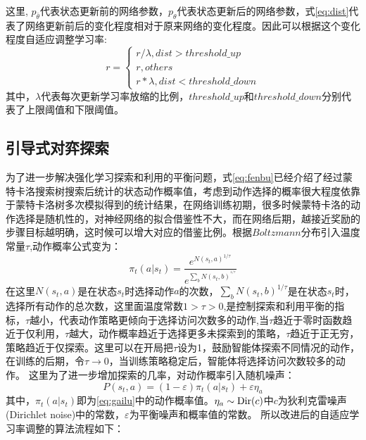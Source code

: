 这里, $p_{\bar \theta}$代表状态更新前的网络参数，$p_\theta $代表状态更新后的网络参数，式\ref{eq:dist}代表了网络更新前后的变化程度相对于原来网络的变化程度。因此可以根据这个变化程度自适应调整学习率:
\begin{equation}
\label{eq:r}
r = \left\{ {\begin{array}{*{20}{c}}
	{r/\lambda ,dist > threshold\_up}\\
	{r,others}\\
	{r*\lambda ,dist < threshold\_down}
	\end{array}} \right.
\end{equation}
其中，$\lambda$代表每次更新学习率放缩的比例，$threshold\_up$和$threshold\_down$分别代表了上限阈值和下限阈值。
\subsection{引导式对弈探索}
为了进一步解决强化学习探索和利用的平衡问题，式\ref{eq:fenbu}已经介绍了经过蒙特卡洛搜索树搜索后统计的状态动作概率值，考虑到动作选择的概率很大程度依靠于蒙特卡洛树多次模拟得到的统计结果，在网络训练初期，很多时候蒙特卡洛的动作选择是随机性的，对神经网络的拟合借鉴性不大，而在网络后期，越接近奖励的步骤目标越明确，这时候可以增大对应的借鉴比例。根据$Boltzmann$分布引入温度常量$\tau $,动作概率公式变为：
\begin{equation}
\label{eq:gailu}
{\pi _t}(a|{s_t}) = \frac{{{e^{N{{({s_t},a)}^{1/\tau }}}}}}{{{e^{\sum\nolimits_b {N{{({s_t},b)}^{^{1/\tau }}}} }}}}
\end{equation}
在这里${N({s_t},a)}$是在状态$s_t$时选择动作$a$的次数，${\sum\nolimits_b {N{{({s_t},b)}^{1/\tau }}} }$是在状态$s_t$时，选择所有动作的总次数，这里面温度常数$1>\tau>0$,是控制探索和利用平衡的指标，$\tau$越小，代表动作策略更倾向于选择访问次数多的动作,当$\tau$趋近于零时函数趋近于仅利用，$\tau$越大，动作概率趋近于选择更多未探索到的策略，$\tau$趋近于正无穷，策略趋近于仅探索。这里可以在开局把$\tau$设为1，鼓励智能体探索不同情况的动作，在训练的后期，令$\tau  \to 0$，当训练策略稳定后，智能体将选择访问次数较多的动作。
这里为了进一步增加探索的几率，对动作概率引入随机噪声：
\begin{equation}
\label{eq:zaosheng}
	P({s_t},a) = (1 - \varepsilon ){\pi _t}(a|{s_t}) + \varepsilon {\eta _a}
\end{equation}
其中，${\pi _t}(a|{s_t})$即为\ref{eq:gailu}中的动作概率值。${\eta _a} \sim {\rm{Dir}}(c)$中$c$为狄利克雷噪声(Dirichlet noise)中的常数，$\varepsilon$为平衡噪声和概率值的常数。
所以改进后的自适应学习率调整的算法流程如下：
